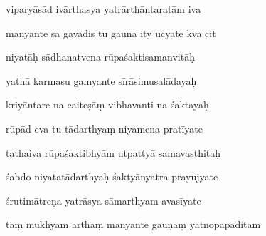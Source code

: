 \documentclass[article,12pt,a4paper]{memoir}%
\newcounter{parCount}
\begin{document}
	  
	  \pstart {} viparyāsād ivārthasya yatrārthāntaratām iva 
	{}
	\pend%
      

	  
	  \pstart \leavevmode%
	manyante sa gavādis tu gauṇa ity ucyate kva cit 
	{}
	\pend%
      

	  
	  \pstart {} niyatāḥ sādhanatvena rūpaśaktisamanvitāḥ 
	{}
	\pend%
      

	  
	  \pstart \leavevmode%
	yathā karmasu gamyante sīrāsimusalādayaḥ 
	{}
	\pend%
      

	  
	  \pstart {} kriyāntare na caiteṣāṃ vibhavanti na śaktayaḥ 
	{}
	\pend%
      

	  
	  \pstart \leavevmode%
	rūpād eva tu tādarthyaṃ niyamena pratīyate 
	{}
	\pend%
      

	  
	  \pstart {} tathaiva rūpaśaktibhyām utpattyā samavasthitaḥ 
	{}
	\pend%
      

	  
	  \pstart \leavevmode%
	śabdo niyatatādarthyaḥ śaktyānyatra prayujyate 
	{}
	\pend%
      

	  
	  \pstart {} śrutimātreṇa yatrāsya sāmarthyam avasīyate 
	{}
	\pend%
      

	  
	  \pstart \leavevmode%
	taṃ mukhyam arthaṃ manyante gauṇaṃ yatnopapāditam 
	{}
	\pend%
      
\end{document}
